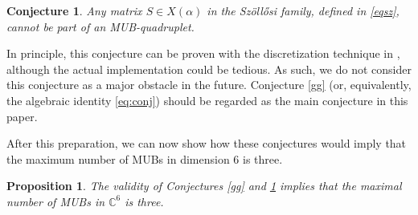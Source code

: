 \documentclass[12pt]{amsart}
\numberwithin{equation}{section}
\newtheorem{conjecture}{Conjecture}
\newtheorem{proposition}[fact]{Proposition}
\theoremstyle{definition}
\theoremstyle{remark}
\theoremstyle{remark}
\newcommand{\Co}{\ensuremath{\mathbb{C}}}
\begin{document}
\begin{conjecture}\label{szol}
Any matrix $S\in X(\alpha)$ in the Sz\"oll\H osi family, defined in \ref{eqsz}, cannot be part of an MUB-quadruplet. 
\end{conjecture}

In principle, this conjecture can be proven with the discretization technique in \cite{arxiv}, although the actual implementation could be tedious. As such, we do not consider this conjecture as a major obstacle in the future. Conjecture \ref{gg} (or, equivalently, the algebraic identity \eqref{eq:conj}) should be regarded as the main conjecture in this paper.

\medskip

After this preparation, we can now show how these conjectures would imply that the maximum number of MUBs in dimension 6 is three. 




\begin{proposition}\label{propcon1}
The validity of Conjectures \ref{gg} and \ref{szol} implies that the maximal number of MUBs in $\Co^6$ is three.  
\end{proposition} 
\end{document}
